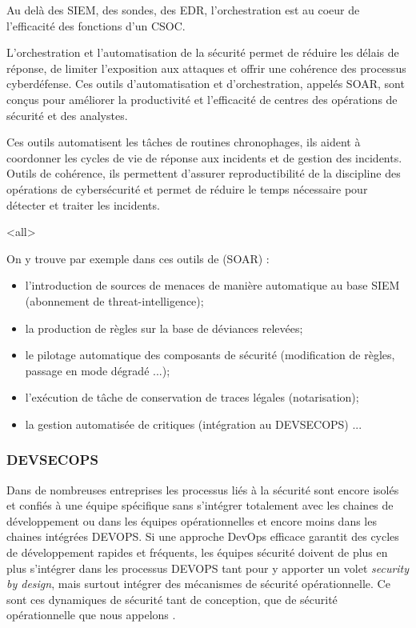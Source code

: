 Au delà des SIEM, des sondes, des EDR, l'orchestration est au coeur de l'efficacité des fonctions d'un CSOC.

L'orchestration et l'automatisation de la sécurité  permet de réduire les délais de réponse, de  limiter l'exposition aux attaques et offrir une cohérence des processus cyberdéfense. Ces  outils d’automatisation et d’orchestration,  appelés SOAR, sont conçus pour améliorer la productivité et l’efficacité de centres des opérations de sécurité et des analystes.

Ces outils automatisent les tâches de routines chronophages,  ils aident à coordonner les cycles de vie de réponse aux incidents et de gestion des incidents. Outils de  cohérence, ils permettent d'assurer reproductibilité de la discipline des opérations de cybersécurité et permet de réduire le temps nécessaire pour détecter et traiter les incidents.


\mode<all>{
{
On y trouve par exemple dans ces outils de   (SOAR) :
\begin{itemize}
  \item l'introduction de sources de menaces de manière automatique au base SIEM (abonnement de threat-intelligence);
  \item la production de règles sur la base de déviances relevées;
  \item le pilotage automatique des composants de sécurité (modification de règles, passage en mode dégradé ...);
  \item l'exécution de tâche de conservation de traces légales (notarisation);
  \item la gestion automatisée de  critiques (intégration au DEVSECOPS) ...
\end{itemize}
}} %



\subsubsection{DEVSECOPS}

Dans de nombreuses entreprises les processus liés à la sécurité sont encore isolés et confiés à une équipe spécifique sans s'intégrer totalement avec les chaines de développement ou dans les équipes opérationnelles et encore moins dans les chaines intégrées DEVOPS. 
 Si une approche DevOps efficace garantit des cycles de développement rapides et fréquents, les équipes sécurité doivent de plus en plus s'intégrer dans les processus DEVOPS tant pour y apporter un volet \textit{security by design}, mais surtout intégrer des mécanismes de sécurité opérationnelle.
 Ce sont ces dynamiques de sécurité tant de conception, que de sécurité opérationnelle que nous appelons .
 

